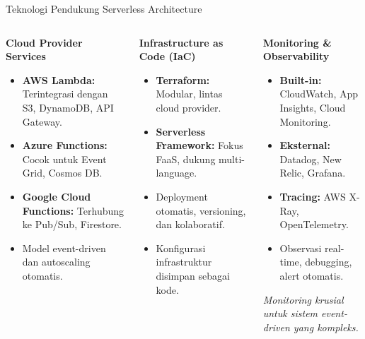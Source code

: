 \documentclass[aspectratio=169, table]{beamer}
\begin{document}
\begin{frame}[fragile]{Teknologi Pendukung Serverless Architecture}
	\vspace{20pt}
	\begin{columns}[T]
		\begin{column}{0.33\textwidth}
			\textbf{Cloud Provider Services}
			\begin{itemize}
				\item \textbf{AWS Lambda:} Terintegrasi dengan S3, DynamoDB, API Gateway.
				\item \textbf{Azure Functions:} Cocok untuk Event Grid, Cosmos DB.
				\item \textbf{Google Cloud Functions:} Terhubung ke Pub/Sub, Firestore.
				\item Model event-driven dan autoscaling otomatis.
			\end{itemize}
		\end{column}
		
		\begin{column}{0.33\textwidth}
			\textbf{Infrastructure as Code (IaC)}
			\begin{itemize}
				\item \textbf{Terraform:} Modular, lintas cloud provider.
				\item \textbf{Serverless Framework:} Fokus FaaS, dukung multi-language.
				\item Deployment otomatis, versioning, dan kolaboratif.
				\item Konfigurasi infrastruktur disimpan sebagai kode.
			\end{itemize}
		\end{column}
		
		\begin{column}{0.33\textwidth}
			\textbf{Monitoring \& Observability}
			\begin{itemize}
				\item \textbf{Built-in:} CloudWatch, App Insights, Cloud Monitoring.
				\item \textbf{Eksternal:} Datadog, New Relic, Grafana.
				\item \textbf{Tracing:} AWS X-Ray, OpenTelemetry.
				\item Observasi real-time, debugging, alert otomatis.
			\end{itemize}
			\vspace{4pt}
			\scriptsize
			\textit{Monitoring krusial untuk sistem event-driven yang kompleks.}
		\end{column}
	\end{columns}
\end{frame}
\end{document}
